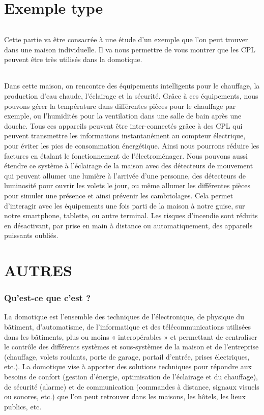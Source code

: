     \clearpage
\part{Exemple type}
            \paragraph{}
Cette partie va être consacrée à une étude d’un exemple que l’on peut trouver dans une maison individuelle.
Il va nous permettre de vous montrer que les CPL peuvent être très utilisés dans la domotique.
            \paragraph{}
Dans cette maison, on rencontre des équipements intelligents pour le chauffage, la production d’eau chaude, l’éclairage et la sécurité.
Grâce à ces équipements, nous pouvons gérer la température dans différentes pièces pour le chauffage par exemple, ou l'humidités pour la ventilation dans une salle de bain après une douche.
Tous ces appareils peuvent être inter-connectés grâce à des CPL qui peuvent transmettre les informations instantanément au compteur électrique, pour éviter les pics de consommation énergétique.
Ainsi nous pourrons réduire les factures en étalant le fonctionnement de l'électroménager.
Nous pouvons aussi étendre ce système à l’éclairage de la maison avec des détecteurs de mouvement qui peuvent allumer une lumière à l’arrivée d’une personne,
des détecteurs de luminosité pour ouvrir les volets le jour, ou même allumer les différentes pièces pour simuler une présence et ainsi prévenir les cambriolages.
Cela permet d'interagir avec les équipements une fois parti de la maison à notre guise, sur notre smartphone, tablette, ou autre terminal.
Les risques d’incendie sont réduits en désactivant, par prise en main à distance ou automatiquement, des appareils puissants oubliés.







    \clearpage

\part{AUTRES}
        \section{Qu’est-ce que c’est ?}
La domotique est l’ensemble des techniques de l'électronique, de physique du bâtiment, d'automatisme, de l'informatique et des télécommunications utilisées dans les bâtiments, plus ou moins « interopérables » et permettant de centraliser le contrôle des différents systèmes et sous-systèmes de la maison et de l'entreprise (chauffage, volets roulants, porte de garage, portail d'entrée, prises électriques, etc.).
La domotique vise à apporter des solutions techniques pour répondre aux besoins de confort (gestion d'énergie, optimisation de l'éclairage et du chauffage), de sécurité (alarme) et de communication (commandes à distance, signaux visuels ou sonores, etc.) que l'on peut retrouver dans les maisons, les hôtels, les lieux publics, etc.
